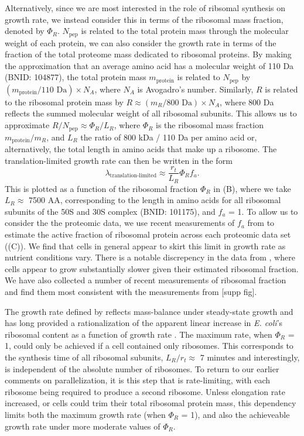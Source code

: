 Alternatively, since we are most interested in the role of ribsomal synthesis on
growth rate, we instead consider this in terms of the ribosomal mass fraction, denoted by $\Phi_R$. $N_\text{pep}$ is related to the total protein mass
through the molecular weight of each protein, we can also consider the growth
rate in terms of the fraction of the total proteome mass dedicated to ribosomal
proteins. By making the approximation that an average amino acid has a molecular
weight of 110 Da (BNID: 104877), the total protein mass $m_\text{protein}$ is
related to $N_\text{pep}$ by $(m_\text{protein}/\text{110 Da}) \times N_A$,
where $N_A$ is Avogadro's number. Similarly, $R$ is related to the ribosomal
protein mass by $R \approx (m_R/\text{800 Da}) \times N_A$, where 800 Da
reflects the summed molecular weight of all ribosomal subunits.  This allows us
to approximate  $R / N_\text{pep} \approx \Phi_R / L_R$,  where $\Phi_R$ is the
ribosomal mass fraction $m_\text{protein}/m_R$, and $L_R$ the ratio of 800 kDa /
110 Da per amino acid or, alternatively, the total length in amino acids that
make up a ribosome. The translation-limited growth rate can then be written in
the form
\begin{equation}
\lambda_{\textrm{translation-limited}} \approx \frac{r_t}{L_R}  \Phi_R f_a.
\label{eq:translation_limit_growth_rate}
\end{equation}
This is plotted as a function of the ribosomal fraction $\Phi_R$ in
(B), where we take $L_R \approx$ 7500 AA, corresponding to
the length in amino acids for all ribosomal subunits of the 50S and 30S complex
(BNID: 101175), and $f_a$ = 1. To allow us to consider the the proteomic data,
we use recent measurements of $f_a$ from \cite{dai2016} to estimate the active
fraction of ribosomal protein across each proteomic data set
((C)). We find that cells in general appear to
skirt this limit in growth rate as nutrient conditions vary. There is a notable discrepency
in the data from \cite{peebo2015, valgepea2013}, where cells appear to grow
substantially slower given their estimated ribosomal fraction. We have
also collected a number of recent measurements of ribosomal fraction and
find them most consistent with the measurements from \cite{li2014,
schmidt2016} [supp fig].

The growth rate defined by  reflects
mass-balance under steady-state growth and has long provided a rationalization
of the apparent linear increase in \textit{E. coli}'s ribosomal content as a
function of growth rate \citep{goldberger1979, scott2010}. The maximum rate,
when $\Phi_R$ = 1, could only be achieved if a cell contained only ribosomes.
This corresponds to the synthesis time of all ribosomal subunits, $L_R/ r_t
\approx$ 7 minutes \citep{dill2011} and interestingly, is independent of the
absolute number of ribosomes. To return to our earlier comments on
parallelization, it is this step that is rate-limiting, with each ribosome being
required to produce a second ribosome. Unless elongation rate increased, or
cells could trim their total ribosomal protein mass, this dependency limits both
the maximum growth rate (when $\Phi_R$ = 1), and also the achieveable growth
rate under more moderate values of $\Phi_R$.


